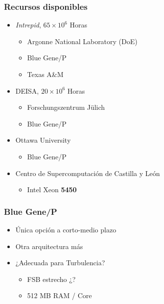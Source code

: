 \documentclass{beamer}
\begin{document}
\begin{frame}
\frametitle{Recursos disponibles}
\begin{itemize}
\item \textit{Intrepid}, $65 \times 10^6$ Horas
  \begin{itemize}
  \item Argonne National Laboratory (DoE)
  \item Blue Gene/P
  \item Texas A\&M
  \end{itemize}
\item DEISA, $20 \times 10^6$ Horas
  \begin{itemize}
  \item Forschungszentrum Jülich 
  \item Blue Gene/P
  \end{itemize}
\item Ottawa University
  \begin{itemize}
  \item Blue Gene/P
  \end{itemize}
\item Centro de Supercomputación de Castilla y León
  \begin{itemize}
  \item Intel Xeon \textbf{5450}
  \end{itemize}
\end{itemize}
\end{frame}

\begin{frame}
\frametitle{Blue Gene/P}
\begin{itemize}
\item Única opción a corto-medio plazo
\item Otra arquitectura más
\item ¿Adecuada para Turbulencia?
\begin{itemize}
\item FSB estrecho ¿?
\item 512 MB RAM / Core
\end{itemize}
\end{itemize}

\pause
\begin{center}
\end{center}


\end{frame}
\end{document}
